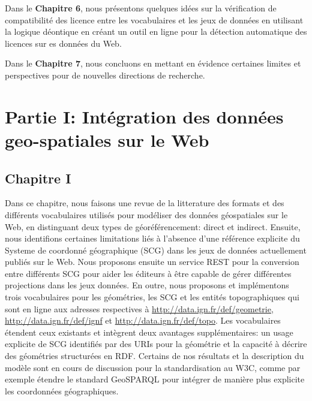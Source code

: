 Dans le \textbf{Chapitre 6}, nous pr\'{e}sentons quelques id\'{e}es sur la v\'{e}rification de compatibilit\'{e} des licence entre les vocabulaires et les jeux de donn\'{e}es en utilisant la logique d\'{e}ontique en cr\'{e}ant un outil en ligne pour la d\'{e}tection automatique des licences sur es donn\'{e}es du Web.

Dans le \textbf{Chapitre 7}, nous concluons en mettant en \'{e}vidence certaines limites et perspectives pour de nouvelles directions de recherche.

\section*{Partie I: Int\'{e}gration des donn\'{e}es geo-spatiales sur le Web}

\subsection*{Chapitre I}
Dans ce chapitre, nous faisons une revue de la litterature des formats et des diff\'{e}rents vocabulaires utilis\'{e}s pour mod\'{e}liser des donn\'{e}es g\'{e}ospatiales sur le Web, en distinguant deux types de g\'{e}or\'{e}f\'{e}rencement: direct et indirect. Ensuite, nous identifions certaines limitations li\'{e}s à l'absence d'une r\'{e}f\'{e}rence explicite du Systeme de coordonn\'{e} g\'{e}ographique (SCG) dans les jeux de donn\'{e}es actuellement publi\'{e}s sur le Web. Nous proposons ensuite un service REST pour la conversion entre diff\'{e}rents SCG pour aider les \'{e}diteurs à \^{e}tre capable de g\'{e}rer diff\'{e}rentes projections dans les jeux donn\'{e}es. En outre, nous proposons et impl\'{e}mentons trois vocabulaires pour les g\'{e}om\'{e}tries, les SCG et les entit\'{e}s topographiques qui sont en ligne aux adresses respectives à \url{http://data.ign.fr/def/geometrie}, \url{http://data.ign.fr/def/ignf} et \url{http://data.ign.fr/def/topo}. Les vocabulaires \'{e}tendent ceux existants et int\`{e}grent deux avantages suppl\'{e}mentaires: un usage explicite de SCG identifi\'{e}s par des URIs pour la g\'{e}om\'{e}trie et la capacit\'{e} à d\'{e}crire des g\'{e}om\'{e}tries structur\'{e}es en RDF. Certains de nos r\'{e}sultats et la description du mod\`{e}le sont en cours de discussion pour la standardisation au W3C, comme par exemple \'{e}tendre le standard  GeoSPARQL pour int\'{e}grer de mani\`{e}re plus explicite les coordonn\'{e}es g\'{e}ographiques.

